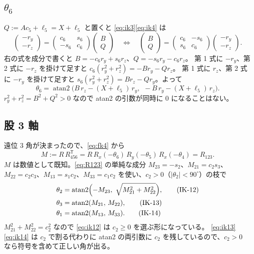 \documentclass[a4paper,11pt]{ltjsarticle}
\newcommand{\Rx}{R_x}\newcommand{\Ry}{R_y}\newcommand{\Rz}{R_z}
\newcommand{\cs}[1]{c_{#1}}\newcommand{\sn}[1]{s_{#1}}
\newcommand{\T}{^{\mathsf T}}
\begin{document}
\subsection{$\theta_6$}
$Q:=A\cs5+\ell_5=X+\ell_5$ と置くと \eqref{eq:ik3}\eqref{eq:ik4} は
\begin{equation}
\begin{pmatrix}-r_y\\-r_z\end{pmatrix}=\begin{pmatrix}\cs6&\sn6\\-\sn6&\cs6\end{pmatrix}\begin{pmatrix}B\\Q\end{pmatrix}
\quad\Longleftrightarrow\quad
\begin{pmatrix}B\\Q\end{pmatrix}=\begin{pmatrix}\cs6&-\sn6\\\sn6&\cs6\end{pmatrix}\begin{pmatrix}-r_y\\-r_z\end{pmatrix}.
\end{equation}
右の式を成分で書くと $B=-\cs6r_y+\sn6r_z$、$Q=-\sn6r_y-\cs6r_z$。
第 1 式に $-r_y$、第 2 式に $-r_z$ を掛けて足すと $\cs6(r_y^2+r_z^2)=-Br_y-Qr_z$。
第 1 式に $r_z$、第 2 式に $-r_y$ を掛けて足すと $\sn6(r_y^2+r_z^2)=Br_z-Qr_y$。よって
\begin{equation}
\theta_6=\operatorname{atan2}\bigl(B\,r_z-(X+\ell_5)\,r_y,\ \ -B\,r_y-(X+\ell_5)\,r_z\bigr).
\tag{IK-10}\label{eq:ik10}
\end{equation}
$r_y^2+r_z^2=B^2+Q^2>0$ なので atan2 の引数が同時に 0 になることはない。

\subsection{股 3 軸}
遠位 3 角が決まったので、\eqref{eq:fk4} から
\begin{equation}
M:=R\,R_{456}\T=R\,\Rx(-\theta_6)\,\Ry(-\theta_5)\,\Rx(-\theta_4)=R_{123}.
\tag{IK-11}\label{eq:ik11}
\end{equation}
$M$ は数値として既知。\eqref{eq:R123} の単純な成分
$M_{23}=-\sn2$、$M_{21}=\cs2\sn3$、$M_{22}=\cs2\cs3$、$M_{13}=\sn1\cs2$、$M_{33}=\cs1\cs2$ を使い、$\cs2>0$（$|\theta_2|<90^\circ$）の枝で
\begin{align}
\theta_2&=\operatorname{atan2}\Bigl(-M_{23},\ \sqrt{M_{21}^2+M_{22}^2}\Bigr), \tag{IK-12}\label{eq:ik12}\\
\theta_3&=\operatorname{atan2}(M_{21},\,M_{22}), \tag{IK-13}\label{eq:ik13}\\
\theta_1&=\operatorname{atan2}(M_{13},\,M_{33}). \tag{IK-14}\label{eq:ik14}
\end{align}
$M_{21}^2+M_{22}^2=\cs2^2$ なので \eqref{eq:ik12} は $\cs2\ge0$ を選ぶ形になっている。
\eqref{eq:ik13}\eqref{eq:ik14} は $\cs2$ で割る代わりに atan2 の両引数に $\cs2$ を残しているので、$\cs2>0$ なら符号を含めて正しい角が出る。
\end{document}
